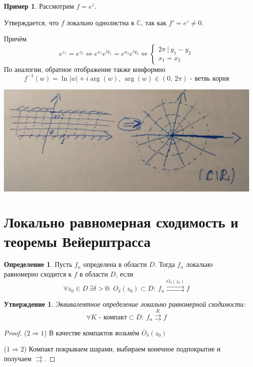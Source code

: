 \documentclass[a4paper,12pt]{article}
\theoremstyle{plain}
\newtheorem{proposition}{Утверждение}[section]
\theoremstyle{definition}
\newtheorem{definition}{Определение}[section]
\newtheorem*{example}{Пример}
\theoremstyle{remark}
\begin{document}
\begin{example}
	Рассмотрим $f = e^z$.

	Утверждается, что $f$ локально однолистна в $\mathbb{C}$, так как $f' = e^z \neq 0$.

	Причём
	\[
		e^{z_1} = e^{z_2} \Leftrightarrow e^{x_1}e^{iy_1} = e^{x_2}e^{iy_2} \Leftrightarrow \begin{cases}
			2\pi \:\vert\: y_1 - y_2 \\
			x_1 = x_2
		\end{cases}
	\]
	По аналогии, обратное отображение также конформно
	\[
		f^{-1}(w) = \ln\vert w\vert + i\arg(w),\, \arg(w) \in (0,\, 2\pi) \text{ - ветвь корня}	
	\] 

	\includegraphics[scale=0.3]{assets/exp_ex.png}
\end{example}

\section{Локально равномерная сходимость и теоремы Вейерштрасса}
\begin{definition}
	Пусть $f_n$ определена в области $D$. Тогда $f_n$ локально равномерно сходится к $f$ в области $D$, если
	\[
		\forall z_0 \in D \: \exists \delta > 0 :\: O_\delta(z_0) \subset D :\: f_n \overset{O_\delta(z_0)}{\rightrightarrows} f
	\]
\end{definition}

\begin{proposition}
	Эквивалентное определение локально равномерной сходимости:
	\[
		\forall K \text{ - компакт}\subset D :\: f_n \overset{K}{\rightrightarrows} f
	\]
\end{proposition}

\begin{proof}
	($2 \Rightarrow 1$) В качестве компактов возьмём $\overline{O}_\delta(z_0)$

	($1 \Rightarrow 2$) Компакт покрываем шарами, выбираем конечное подпокрытие и получаем $\rightrightarrows$.
\end{proof}
\end{document}
